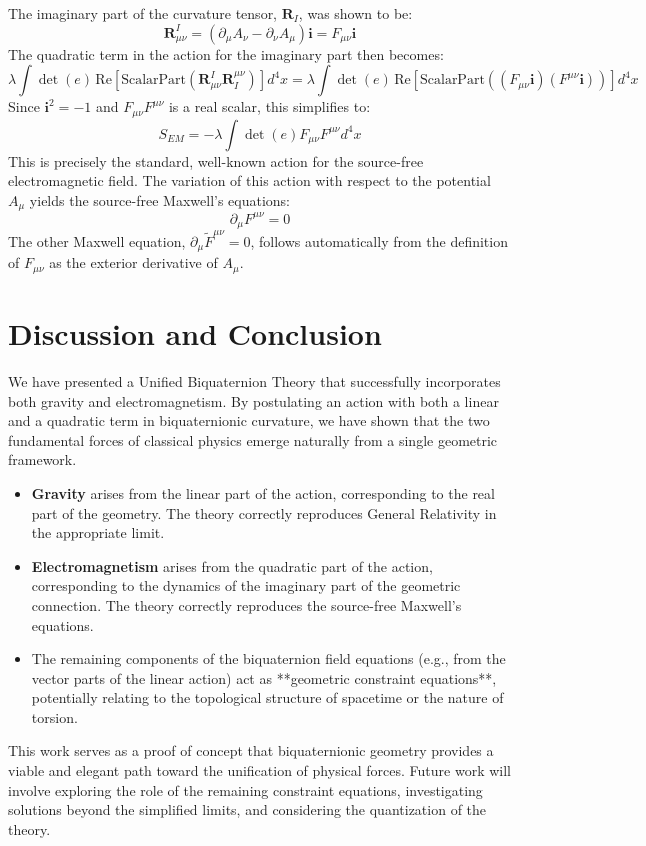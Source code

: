 \documentclass[11pt, a4paper]{article}
\begin{document}
The imaginary part of the curvature tensor, \( \mathbf{R}_I \), was shown to be:
\begin{equation}
\mathbf{R}^I_{\mu\nu} = (\partial_\mu A_\nu - \partial_\nu A_\mu) \mathbf{i} = F_{\mu\nu} \mathbf{i}
\end{equation}
The quadratic term in the action for the imaginary part then becomes:
\begin{equation}
\lambda \int \det(e) \, \text{Re}\left[\text{ScalarPart}(\mathbf{R}^I_{\mu\nu} \mathbf{R}^{\mu\nu}_I)\right] d^4x = \lambda \int \det(e) \, \text{Re}\left[\text{ScalarPart}((F_{\mu\nu}\mathbf{i})(F^{\mu\nu}\mathbf{i}))\right] d^4x
\end{equation}
Since \( \mathbf{i}^2 = -1 \) and \( F_{\mu\nu}F^{\mu\nu} \) is a real scalar, this simplifies to:
\begin{equation}
S_{EM} = -\lambda \int \det(e) F_{\mu\nu}F^{\mu\nu} d^4x
\end{equation}
This is precisely the standard, well-known action for the source-free electromagnetic field. The variation of this action with respect to the potential \( A_\mu \) yields the source-free Maxwell's equations:
\begin{equation}
\boxed{\partial_\mu F^{\mu\nu} = 0}
\end{equation}
The other Maxwell equation, \( \partial_\mu \tilde{F}^{\mu\nu} = 0 \), follows automatically from the definition of \( F_{\mu\nu} \) as the exterior derivative of \( A_\mu \).

\section{Discussion and Conclusion}
We have presented a Unified Biquaternion Theory that successfully incorporates both gravity and electromagnetism. By postulating an action with both a linear and a quadratic term in biquaternionic curvature, we have shown that the two fundamental forces of classical physics emerge naturally from a single geometric framework.

\begin{itemize}
    \item \textbf{Gravity} arises from the linear part of the action, corresponding to the real part of the geometry. The theory correctly reproduces General Relativity in the appropriate limit.
    \item \textbf{Electromagnetism} arises from the quadratic part of the action, corresponding to the dynamics of the imaginary part of the geometric connection. The theory correctly reproduces the source-free Maxwell's equations.
    \item The remaining components of the biquaternion field equations (e.g., from the vector parts of the linear action) act as **geometric constraint equations**, potentially relating to the topological structure of spacetime or the nature of torsion.
\end{itemize}

This work serves as a proof of concept that biquaternionic geometry provides a viable and elegant path toward the unification of physical forces. Future work will involve exploring the role of the remaining constraint equations, investigating solutions beyond the simplified limits, and considering the quantization of the theory.
\end{document}
